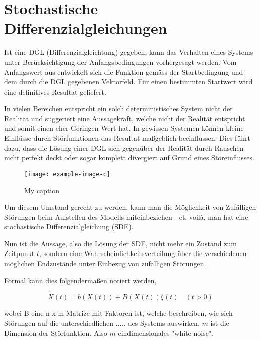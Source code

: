 %
%
%
%
\section{Stochastische Differenzialgleichungen\label{brown:SDGL}}

Ist eine DGL (Differenzialgleichtung) gegeben, kann das Verhalten eines Systems unter Berücksichtigung der Anfangsbedingungen vorhergesagt werden. Vom Anfangswert aus entwickelt sich die Funktion gemäss der Startbedingung und dem durch die DGL gegebenen Vektorfeld. Für einen bestimmten Startwert wird eine definitives Resultat geliefert.

In vielen Bereichen entspricht ein solch deterministisches System  nicht der Realität und suggeriert eine Aussagekraft, welche nicht der Realität entspricht und somit einen eher Geringen Wert hat. In gewissen Systemen können kleine Einflüsse durch Störfunktionen das Resultat maßgeblich beeinflussen. Dies führt dazu, dass die Lösung einer DGL sich gegenüber der Realität durch Rauschen nicht perfekt deckt oder sogar komplett divergiert auf Grund eines Störeinflusses.


\begin{figure}
	\centering
	\noindent\texttt{[image: example-image-c]} \label{fig:label}
	\caption{My caption}
\end{figure}


Um diesem Umstand gerecht zu werden, kann man die Möglichkeit von Zufälligen Störungen beim Aufstellen des Modells miteinbeziehen - et. voilà, man hat eine stochastische Differenzialgleichung (SDE).

Nun ist die Aussage, also die Lösung der SDE, nicht mehr ein Zustand zum Zeitpunkt $ t $, sondern eine Wahrscheinlichkeitsverteilung über die verschiedenen möglichen Endzustände unter Einbezug von zufälligen Störungen.

Formal kann dies folgendermaßen notiert werden, 

\begin{equation}
\dot{X}(t) = b(X(t)) + B(X(t))\xi(t) \quad (t>0)
\end{equation}

wobei B eine n x m Matrize mit Faktoren ist, welche beschreiben, wie sich Störungen auf die unterschiedlichen ..... des Systems auswirken. $ m $ ist die Dimension der Störfunktion. Also $ m $ eindimensionales "white noise".


